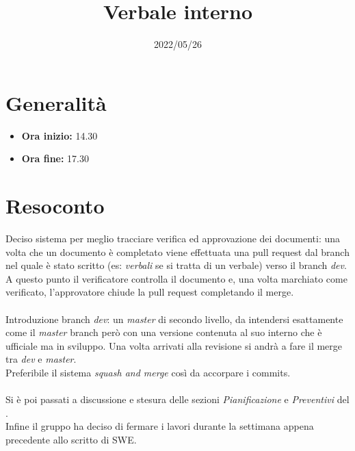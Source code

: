 \documentclass{classes/base}
\title{Verbale interno}
\date{2022/05/26}
\author{\marcob}
\renewcommand{\maketitle}{
    
}
\begin{document}
    \maketitle

    \section*{Generalità}
    \begin{itemize}
        \item \textbf{Ora inizio:} 14.30
        \item \textbf{Ora fine:} 17.30
    \end{itemize}

    \section*{Resoconto}
    Deciso sistema per meglio tracciare verifica ed approvazione dei documenti: una volta 
    che un documento è completato viene effettuata una pull request dal branch nel quale è stato
    scritto (es: \textit{verbali} se si tratta di un verbale) verso il branch \textit{dev}. \\
    A questo punto il verificatore controlla il documento e, una volta marchiato come verificato,
    l'approvatore chiude la pull request completando il merge.\\
    \\
    Introduzione branch \textit{dev}: un \textit{master} di secondo livello, da intendersi esattamente come il
    \textit{master} branch però con una versione contenuta al suo interno che è ufficiale ma in sviluppo.
    Una volta arrivati alla revisione si andrà a fare il merge tra \textit{dev} e \textit{master}.\\
    Preferibile il sistema \textit{squash and merge} così da accorpare i commits.\\
    \\
    Si è poi passati a discussione e stesura delle sezioni \textit{Pianificazione} e \textit{Preventivi}
    del \PdP.\\
    Infine il gruppo ha deciso di fermare i lavori durante la settimana appena precedente allo
    scritto di SWE.
\end{document}
